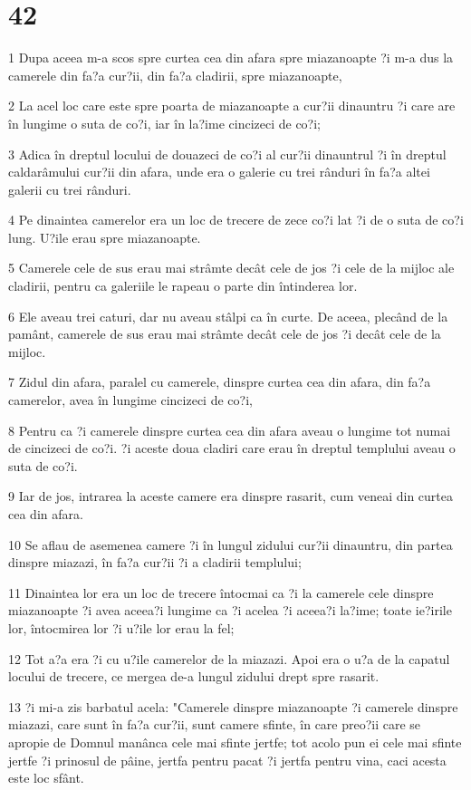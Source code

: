 \chapter{42}

\par 1 Dupa aceea m-a scos spre curtea cea din afara spre miazanoapte ?i m-a dus la camerele din fa?a cur?ii, din fa?a cladirii, spre miazanoapte,
\par 2 La acel loc care este spre poarta de miazanoapte a cur?ii dinauntru ?i care are în lungime o suta de co?i, iar în la?ime cincizeci de co?i;
\par 3 Adica în dreptul locului de douazeci de co?i al cur?ii dinauntrul ?i în dreptul caldarâmului cur?ii din afara, unde era o galerie cu trei rânduri în fa?a altei galerii cu trei rânduri.
\par 4 Pe dinaintea camerelor era un loc de trecere de zece co?i lat ?i de o suta de co?i lung. U?ile erau spre miazanoapte.
\par 5 Camerele cele de sus erau mai strâmte decât cele de jos ?i cele de la mijloc ale cladirii, pentru ca galeriile le rapeau o parte din întinderea lor.
\par 6 Ele aveau trei caturi, dar nu aveau stâlpi ca în curte. De aceea, plecând de la pamânt, camerele de sus erau mai strâmte decât cele de jos ?i decât cele de la mijloc.
\par 7 Zidul din afara, paralel cu camerele, dinspre curtea cea din afara, din fa?a camerelor, avea în lungime cincizeci de co?i,
\par 8 Pentru ca ?i camerele dinspre curtea cea din afara aveau o lungime tot numai de cincizeci de co?i. ?i aceste doua cladiri care erau în dreptul templului aveau o suta de co?i.
\par 9 Iar de jos, intrarea la aceste camere era dinspre rasarit, cum veneai din curtea cea din afara.
\par 10 Se aflau de asemenea camere ?i în lungul zidului cur?ii dinauntru, din partea dinspre miazazi, în fa?a cur?ii ?i a cladirii templului;
\par 11 Dinaintea lor era un loc de trecere întocmai ca ?i la camerele cele dinspre miazanoapte ?i avea aceea?i lungime ca ?i acelea ?i aceea?i la?ime; toate ie?irile lor, întocmirea lor ?i u?ile lor erau la fel;
\par 12 Tot a?a era ?i cu u?ile camerelor de la miazazi. Apoi era o u?a de la capatul locului de trecere, ce mergea de-a lungul zidului drept spre rasarit.
\par 13 ?i mi-a zis barbatul acela: "Camerele dinspre miazanoapte ?i camerele dinspre miazazi, care sunt în fa?a cur?ii, sunt camere sfinte, în care preo?ii care se apropie de Domnul manânca cele mai sfinte jertfe; tot acolo pun ei cele mai sfinte jertfe ?i prinosul de pâine, jertfa pentru pacat ?i jertfa pentru vina, caci acesta este loc sfânt.
